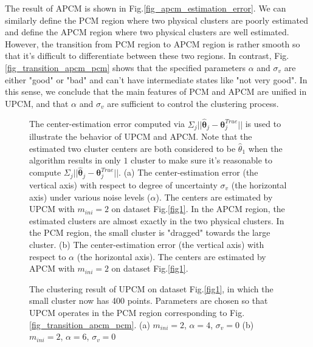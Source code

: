 \documentclass[journal,transmag]{IEEEtran}
\begin{document}
The result of APCM is shown in Fig.\ref{fig_apcm_estimation_error}.
We can similarly define the PCM region where two physical clusters are poorly estimated and define the APCM region where two physical clusters are well estimated.
However, the transition from PCM region to APCM region is rather smooth so that it's difficult to differentiate between these two regions.
In contrast, Fig.\ref{fig_transition_apcm_pcm} shows that the specified parameters $\alpha$ and $\sigma_v$ are either "good" or "bad" and can't have
intermediate states like "not very good". In this sense, we conclude that the main features of PCM and APCM are unified in UPCM, and that $\alpha$ and $\sigma_v$ are sufficient to control the clustering process.
\begin{figure}[!t]
   \centering
\caption{The center-estimation error computed via $\Sigma_j||\hat{\boldsymbol{\theta}}_j-\boldsymbol{\theta}_j^{True}||$ is used to illustrate the behavior of UPCM and APCM. Note that the estimated two cluster centers are both considered to be $\hat{\theta}_1$ when the algorithm results in only $1$ cluster to make sure it's reasonable to compute $\Sigma_j||\hat{\boldsymbol{\theta}}_j-\boldsymbol{\theta}_j^{True}||$. (a) The center-estimation error (the vertical axis) with respect to degree of uncertainty $\sigma_v$ (the horizontal axis) under various noise levels ($\alpha$). The centers are estimated by UPCM with $m_{ini}=2$ on dataset Fig.\ref{fig1}. In the APCM region, the estimated clusters are almost exactly in the two physical clusters. In the PCM region, the small cluster is "dragged" towards the large cluster. (b) The center-estimation error (the vertical axis) with respect to $\alpha$ (the horizontal axis). The centers are estimated by APCM with $m_{ini}=2$ on dataset Fig.\ref{fig1}.}
\label{estimation_error_contrast}
\end{figure}
\begin{figure}[!t]
   \centering
\caption{The clustering result of UPCM on dataset Fig.\ref{fig1}, in which the small cluster now has 400 points. Parameters are chosen so that UPCM operates in the PCM region corresponding to Fig.\ref{fig_transition_apcm_pcm}. (a) $m_{ini}=2$, $\alpha=4$, $\sigma_v=0$ (b) $m_{ini}=2$, $\alpha=6$, $\sigma_v=0$}
\label{fig1_merge_case_upcm}
\end{figure}
\end{document}
